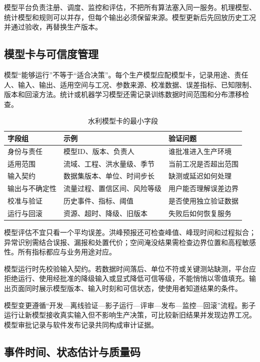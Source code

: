 模型平台负责注册、调度、监控和评估，不把所有算法塞入同一服务。机理模型、统计模型和规则可以并存，但每个输出必须保留来源。模型更新后先回放历史工况并通过验收，再替换生产版本。

\subsection{模型卡与可信度管理}

模型“能够运行”不等于“适合决策”。每个生产模型应配模型卡，记录用途、责任人、输入、输出、适用空间与工况、参数来源、校准数据、误差指标、已知限制、版本和回滚方法。统计或机器学习模型还需记录训练数据时间范围和分布漂移检查。

\begin{table}[htbp]
\centering
\caption{水利模型卡的最小字段}
\label{tab:model-card}
\begin{tabular}{p{3.0cm}p{4.2cm}p{5.2cm}}
\toprule
字段组 & 示例 & 验证问题 \\
\midrule
身份与责任 & 模型ID、版本、负责人 & 谁批准进入生产环境 \\
适用范围 & 流域、工程、洪水量级、季节 & 当前工况是否超出范围 \\
输入契约 & 数据集版本、单位、时间步长 & 缺测或延迟如何处理 \\
输出与不确定性 & 流量过程、置信区间、风险等级 & 用户能否理解误差边界 \\
校准与验证 & 历史事件、指标、阈值 & 是否使用独立验证数据 \\
运行与回滚 & 资源、超时、降级、旧版本 & 失败后如何恢复服务 \\
\bottomrule
\end{tabular}
\end{table}

模型评估不宜只看一个平均误差。洪峰预报还可检查峰值、峰现时间和过程拟合；异常识别需结合误报、漏报和处置代价；空间淹没结果需检查边界位置和高程敏感性。所有指标都应与业务用途对应。

模型运行时先校验输入契约。若数据时间落后、单位不符或关键测站缺测，平台应拒绝运行、使用经批准的降级输入或显式降低可信等级，不能悄悄以零值填充。输出页面同时展示模型版本、输入时刻和可信状态，使使用者知道结果的条件。

模型变更遵循“开发—离线验证—影子运行—评审—发布—监控—回滚”流程。影子运行让新模型接收真实输入但不影响生产决策，可比较新旧结果并发现边界工况。模型审批记录与软件发布记录共同构成审计证据。

\subsection{事件时间、状态估计与质量码}

